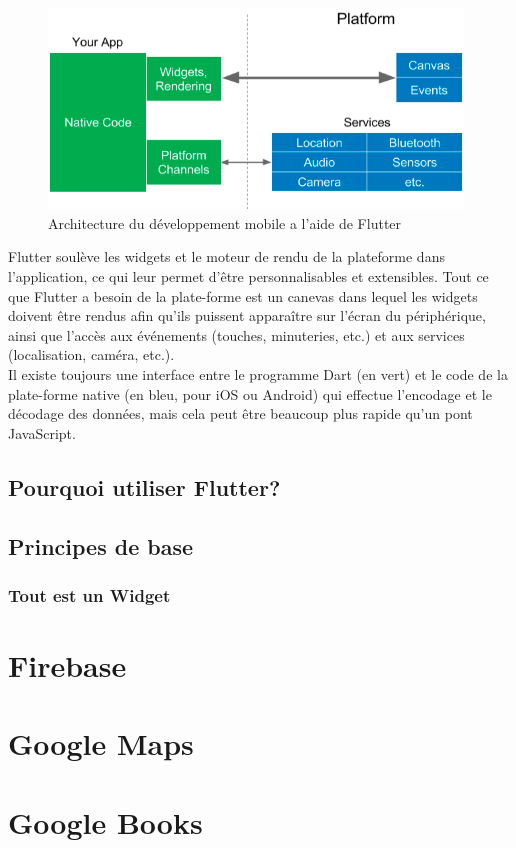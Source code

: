 \begin{figure}[h]
	\begin{center}
		\includegraphics[width=11cm]{Images/chapter2/flutter.png}
		\caption{{\footnotesize Architecture du développement mobile a l'aide de Flutter\cite{leler_whats_2017}}}
	\end{center}
\end{figure}

\tab Flutter soulève les widgets et le moteur de rendu de la plateforme dans l'application, ce qui leur permet d'être personnalisables et extensibles. Tout ce que Flutter a besoin de la plate-forme est un canevas dans lequel les widgets doivent être rendus afin qu’ils puissent apparaître sur l’écran du périphérique, ainsi que l’accès aux événements (touches, minuteries, etc.) et aux services (localisation, caméra, etc.).\medskip \\
\tab Il existe toujours une interface entre le programme Dart (en vert) et le code de la plate-forme native (en bleu, pour iOS ou Android) qui effectue l’encodage et le décodage des données, mais cela peut être beaucoup plus rapide qu’un pont JavaScript.

\subsection{Pourquoi utiliser Flutter?}



\subsection{Principes de base}
\subsubsection{Tout est un Widget}


\section{Firebase}

\section{Google Maps}

\section{Google Books}